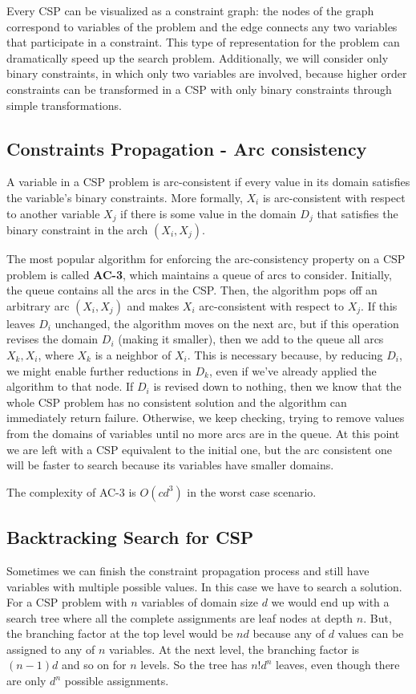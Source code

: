 \documentclass{article}
\begin{document}
Every CSP can be visualized as a constraint graph: the nodes of the graph correspond to variables of the problem and the edge connects any two variables that participate in a constraint. This type of representation for the problem can dramatically speed up the search problem. Additionally, we will consider only binary constraints, in which only two variables are involved, because higher order constraints can be transformed in a CSP with only binary constraints through simple transformations.

\subsection{Constraints Propagation - Arc consistency}
A variable in a CSP problem is arc-consistent if every value in its domain satisfies the variable's binary constraints. More formally, $X_i$ is arc-consistent with respect to another variable $X_j$ if there is some value in the domain $D_j$ that satisfies the binary constraint in the arch $(X_i, X_j)$.

The most popular algorithm for enforcing the arc-consistency property on a CSP problem is called \textbf{AC-3}, which maintains a queue of arcs to consider. Initially, the queue contains all the arcs in the CSP. Then, the algorithm pops off an arbitrary arc $(X_i, X_j)$ and makes $X_i$ arc-consistent with respect to $X_j$. If this leaves $D_i$ unchanged, the algorithm moves on the next arc, but if this operation revises the domain $D_i$ (making it smaller), then we add to the queue all arcs $X_k, X_i$, where $X_k$ is a neighbor of $X_i$. This is necessary because, by reducing $D_i$, we might enable further reductions in $D_k$, even if we've already applied the algorithm to that node. If $D_i$ is revised down to nothing, then we know that the whole CSP problem has no consistent solution and the algorithm can immediately return failure. Otherwise, we keep checking, trying to remove values from the domains of variables until no more arcs are in the queue. At this point we are left with a CSP equivalent to the initial one, but the arc consistent one will be faster to search because its variables have smaller domains.

The complexity of AC-3 is $O(cd^3)$ in the worst case scenario.

\subsection{Backtracking Search for CSP}
Sometimes we can finish the constraint propagation process and still have variables with multiple possible values. In this case we have to search a solution. For a CSP problem with $n$ variables of domain size $d$ we would end up with a search tree where all the complete assignments are leaf nodes at depth $n$. But, the branching factor at the top level would be $nd$ because any of $d$ values can be assigned to any of $n$ variables. At the next level, the branching factor is $(n-1)d$ and so on for $n$ levels. So the tree has $n!d^n$ leaves, even though there are only $d^n$ possible assignments.
\end{document}
